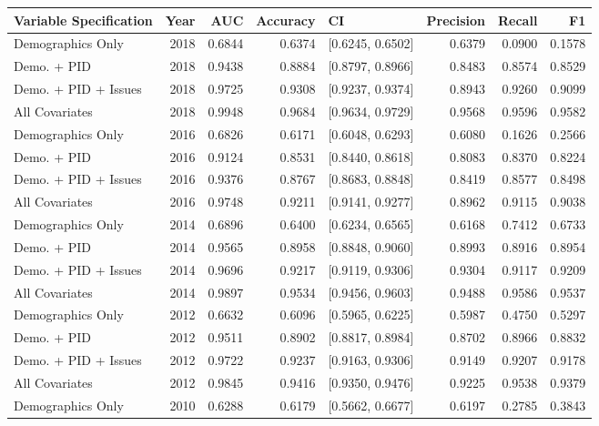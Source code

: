 \begin{table}[H]
\centering
\begin{tabular}{lrrrlrrr}
  \toprule
Variable Specification & Year & AUC & Accuracy & CI & Precision & Recall & F1 \\ 
  \midrule
Demographics Only & 2018 & 0.6844 & 0.6374 & [0.6245, 0.6502] & 0.6379 & 0.0900 & 0.1578 \\ 
  Demo. + PID & 2018 & 0.9438 & 0.8884 & [0.8797, 0.8966] & 0.8483 & 0.8574 & 0.8529 \\ 
  Demo. + PID + Issues & 2018 & 0.9725 & 0.9308 & [0.9237, 0.9374] & 0.8943 & 0.9260 & 0.9099 \\ 
  All Covariates & 2018 & 0.9948 & 0.9684 & [0.9634, 0.9729] & 0.9568 & 0.9596 & 0.9582 \\ 
  Demographics Only & 2016 & 0.6826 & 0.6171 & [0.6048, 0.6293] & 0.6080 & 0.1626 & 0.2566 \\ 
  Demo. + PID & 2016 & 0.9124 & 0.8531 & [0.8440, 0.8618] & 0.8083 & 0.8370 & 0.8224 \\ 
  Demo. + PID + Issues & 2016 & 0.9376 & 0.8767 & [0.8683, 0.8848] & 0.8419 & 0.8577 & 0.8498 \\ 
  All Covariates & 2016 & 0.9748 & 0.9211 & [0.9141, 0.9277] & 0.8962 & 0.9115 & 0.9038 \\ 
  Demographics Only & 2014 & 0.6896 & 0.6400 & [0.6234, 0.6565] & 0.6168 & 0.7412 & 0.6733 \\ 
  Demo. + PID & 2014 & 0.9565 & 0.8958 & [0.8848, 0.9060] & 0.8993 & 0.8916 & 0.8954 \\ 
  Demo. + PID + Issues & 2014 & 0.9696 & 0.9217 & [0.9119, 0.9306] & 0.9304 & 0.9117 & 0.9209 \\ 
  All Covariates & 2014 & 0.9897 & 0.9534 & [0.9456, 0.9603] & 0.9488 & 0.9586 & 0.9537 \\ 
  Demographics Only & 2012 & 0.6632 & 0.6096 & [0.5965, 0.6225] & 0.5987 & 0.4750 & 0.5297 \\ 
  Demo. + PID & 2012 & 0.9511 & 0.8902 & [0.8817, 0.8984] & 0.8702 & 0.8966 & 0.8832 \\ 
  Demo. + PID + Issues & 2012 & 0.9722 & 0.9237 & [0.9163, 0.9306] & 0.9149 & 0.9207 & 0.9178 \\ 
  All Covariates & 2012 & 0.9845 & 0.9416 & [0.9350, 0.9476] & 0.9225 & 0.9538 & 0.9379 \\ 
  Demographics Only & 2010 & 0.6288 & 0.6179 & [0.5662, 0.6677] & 0.6197 & 0.2785 & 0.3843 \\ 

\end{tabular}
\end{table}
